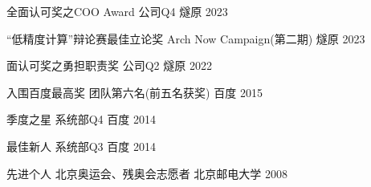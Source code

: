 
\begin{cvhonors}

  \cvhonor
    {全面认可奖之COO Award} %
    {公司Q4} %
    {燧原} %
    {2023} %

  \cvhonor
    {“低精度计算”辩论赛最佳立论奖} %
    {Arch Now Campaign(第二期)} %
    {燧原} %
    {2023} %

  \cvhonor
    {面认可奖之勇担职责奖} %
    {公司Q2} %
    {燧原} %
    {2022} %

  \cvhonor
    {入围百度最高奖} %
    {团队第六名(前五名获奖)} %
    {百度} %
    {2015} %

  \cvhonor
    {季度之星} %
    {系统部Q4} %
    {百度} %
    {2014} %

  \cvhonor
    {最佳新人} %
    {系统部Q3} %
    {百度} %
    {2014} %

  \cvhonor
    {先进个人} %
    {北京奥运会、残奥会志愿者} %
    {北京邮电大学} %
    {2008} %

\end{cvhonors}
